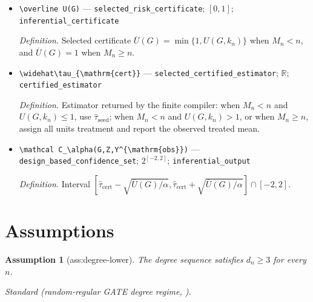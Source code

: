 \documentclass{article}
\newtheorem{assumption}{Assumption}
\begin{document}
\begin{itemize}
  \par\smallskip\noindent\emph{Definition.} On \(M_n<n\), the certificate \(U(G,k_n)=2/k_n+2\|B_2(G)P_n\|_{\mathrm{op}}^2[(1-M_n/n)^{-k_n}-1]/[nM_n(1-M_n/n)]\), using the graph-selected count; it is not formed on the fallback branch.
  \item \texttt{\textbackslash{}\allowbreak{}overline U(G)} --- \texttt{selected\_\allowbreak{}risk\_\allowbreak{}certificate}; \([0,1]\); \texttt{inferential\_\allowbreak{}certificate}
  \par\smallskip\noindent\emph{Definition.} Selected certificate \(\overline U(G)=\min\{1,U(G,k_n)\}\) when \(M_n<n\), and \(\overline U(G)=1\) when \(M_n\ge n\).
  \item \texttt{\textbackslash{}\allowbreak{}widehat\textbackslash{}\allowbreak{}tau\_\allowbreak{}\{\textbackslash{}\allowbreak{}mathrm\{cert\}\allowbreak{}\}\allowbreak{}} --- \texttt{selected\_\allowbreak{}certified\_\allowbreak{}estimator}; \(\mathbb R\); \texttt{certified\_\allowbreak{}estimator}
  \par\smallskip\noindent\emph{Definition.} Estimator returned by the finite compiler: when \(M_n<n\) and \(U(G,k_n)\le1\), use \(\widehat\tau_{\mathrm{seed}}\); when \(M_n<n\) and \(U(G,k_n)>1\), or when \(M_n\ge n\), assign all units treatment and report the observed treated mean.
  \item \texttt{\textbackslash{}\allowbreak{}mathcal C\_\allowbreak{}\textbackslash{}\allowbreak{}alpha(G,\allowbreak{}Z,\allowbreak{}Y\textasciicircum{}\{\textbackslash{}\allowbreak{}mathrm\{obs\}\allowbreak{}\}\allowbreak{})} --- \texttt{design\_\allowbreak{}based\_\allowbreak{}confidence\_\allowbreak{}set}; \(2^{[-2,2]}\); \texttt{inferential\_\allowbreak{}output}
  \par\smallskip\noindent\emph{Definition.} Interval \([\widehat\tau_{\mathrm{cert}}-\sqrt{\overline U(G)/\alpha},\widehat\tau_{\mathrm{cert}}+\sqrt{\overline U(G)/\alpha}]\cap[-2,2]\).
\end{itemize}

\section{Assumptions}

\begin{assumption}[ass:degree-lower]\label{ass:degree-lower}
The degree sequence satisfies \(d_n\ge3\) for every \(n\).
\par\smallskip\noindent\emph{Standard} (random-regular GATE degree regime, \cite{KandirosHarshawSavje2026Minimax}).
\end{assumption}
\end{document}
